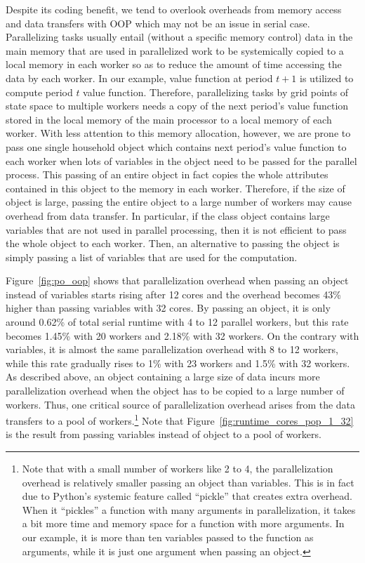 \documentclass[12pt]{article}
\begin{document}
Despite its coding benefit, we tend to overlook overheads from memory access and data transfers with OOP which may not be an issue in serial case. Parallelizing tasks usually entail (without a specific memory control) data in the main memory that are used in parallelized work to be systemically copied to a local memory in each worker so as to reduce the amount of time accessing the data by each worker. In our example, value function at period $t+1$ is utilized to compute period $t$ value function. Therefore, parallelizing tasks by grid points of state space to multiple workers needs a copy of the next period's value function stored in the local memory of the main processor to a local memory of each worker. With less attention to this memory allocation, however, we are prone to pass one single household object which contains next period's value function to each worker when lots of variables in the object need to be passed for the parallel process. This passing of an entire object in  fact copies the whole attributes contained in this object to the memory in each worker. Therefore, if the size of object is large, passing the entire object to a large number of workers may cause overhead from data transfer. In particular, if the class object contains large variables that are not used in parallel processing, then it is not efficient to pass the whole object to each worker. Then, an alternative to passing the object is simply passing a list of variables that are used for the computation.

Figure~\ref{fig:po_oop} shows that parallelization overhead when passing an object instead of variables starts rising after 12 cores and the overhead becomes 43\% higher than passing variables with 32 cores. By passing an object, it is only around 0.62\% of total serial runtime with 4 to 12 parallel workers, but this rate becomes 1.45\% with 20 workers and 2.18\% with 32 workers. On the contrary with variables, it is almost the same parallelization overhead with 8 to 12 workers, while this rate gradually rises to 1\% with 23 workers and 1.5\% with 32 workers. As described above, an object containing a large size of data incurs more parallelization overhead when the object has to be copied to a large number of workers. Thus, one critical source of parallelization overhead arises from the data transfers to a pool of workers.\footnote{\sf Note that with a small number of workers like 2 to 4, the parallelization overhead is relatively smaller passing an object than variables. This is in fact due to Python's systemic feature called ``pickle'' that creates extra overhead. When it ``pickles'' a function with many arguments in parallelization, it takes a bit more time and memory space for a function with more arguments. In our example, it is more than ten variables passed to the function as arguments, while it is just one argument when passing an object.} Note that Figure~\ref{fig:runtime_cores_pop_1_32} is the result from passing variables instead of object to a pool of workers.
\end{document}
